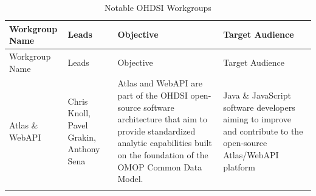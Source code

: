 \documentclass[11pt]{book}
\theoremstyle{definition}
\theoremstyle{definition}
\theoremstyle{definition}
\theoremstyle{remark}
\begin{document}
\begin{longtable}[]{@{}llll@{}}
\caption{\label{tab:OHDSIworkgroups} Notable OHDSI Workgroups}\tabularnewline
\toprule
\begin{minipage}[b]{0.22\columnwidth}\raggedright
Workgroup Name\strut
\end{minipage} & \begin{minipage}[b]{0.22\columnwidth}\raggedright
Leads\strut
\end{minipage} & \begin{minipage}[b]{0.22\columnwidth}\raggedright
Objective\strut
\end{minipage} & \begin{minipage}[b]{0.22\columnwidth}\raggedright
Target Audience\strut
\end{minipage}\tabularnewline
\midrule
\endfirsthead
\toprule
\begin{minipage}[b]{0.22\columnwidth}\raggedright
Workgroup Name\strut
\end{minipage} & \begin{minipage}[b]{0.22\columnwidth}\raggedright
Leads\strut
\end{minipage} & \begin{minipage}[b]{0.22\columnwidth}\raggedright
Objective\strut
\end{minipage} & \begin{minipage}[b]{0.22\columnwidth}\raggedright
Target Audience\strut
\end{minipage}\tabularnewline
\midrule
\endhead
\begin{minipage}[t]{0.22\columnwidth}\raggedright
Atlas \& WebAPI\strut
\end{minipage} & \begin{minipage}[t]{0.22\columnwidth}\raggedright
Chris Knoll, Pavel Grakin, Anthony Sena\strut
\end{minipage} & \begin{minipage}[t]{0.22\columnwidth}\raggedright
Atlas and WebAPI are part of the OHDSI open-source software architecture that aim to provide standardized analytic capabilities built on the foundation of the OMOP Common Data Model.\strut
\end{minipage} & \begin{minipage}[t]{0.22\columnwidth}\raggedright
Java \& JavaScript software developers aiming to improve and contribute to the open-source Atlas/WebAPI platform\strut
\end{minipage}\tabularnewline
\begin{minipage}[t]{0.22\columnwidth}\raggedright

\end{minipage}
\end{longtable}
\end{document}
